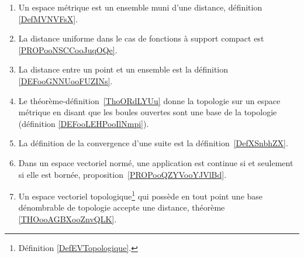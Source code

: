 \begin{enumerate}
	\item
	      Un espace métrique est un ensemble muni d'une distance, définition \ref{DefMVNVFsX}.
	\item
	      La distance uniforme dans le cas de fonctions à support compact est \ref{PROPooNSCCooJuqOQe}.
	\item
	      La distance entre un point et un ensemble est la définition \ref{DEFooGNNUooFUZINs}.
	\item
	      Le théorème-définition~\ref{ThoORdLYUu} donne la topologie sur un espace métrique en disant que les boules ouvertes sont une base de la topologie (définition \ref{DEFooLEHPooIlNmpi}).
	\item
	      La définition de la convergence d'une suite est la définition~\ref{DefXSnbhZX}.
	\item
	      Dans un espace vectoriel normé, une application est continue si et seulement si elle est bornée, proposition~\ref{PROPooQZYVooYJVlBd}.
	\item
	      Un espace vectoriel topologique\footnote{Définition \ref{DefEVTopologique}.} qui possède en tout point une base dénombrable de topologie accepte une distance, théorème \ref{THOooAGBXooZnvQLK}.
\end{enumerate}
